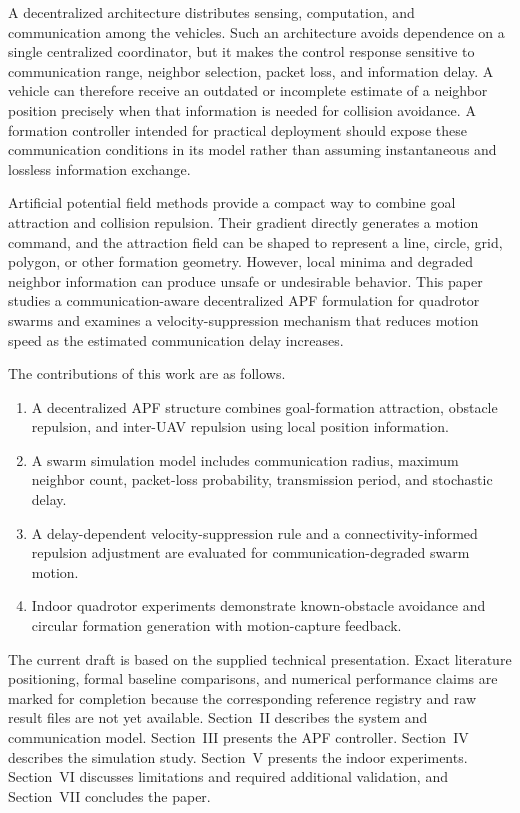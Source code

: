 \documentclass[journal]{IEEEtran}
\begin{document}
A decentralized architecture distributes sensing, computation, and communication among the vehicles. Such an architecture avoids dependence on a single centralized coordinator, but it makes the control response sensitive to communication range, neighbor selection, packet loss, and information delay. A vehicle can therefore receive an outdated or incomplete estimate of a neighbor position precisely when that information is needed for collision avoidance. A formation controller intended for practical deployment should expose these communication conditions in its model rather than assuming instantaneous and lossless information exchange.

Artificial potential field methods provide a compact way to combine goal attraction and collision repulsion. Their gradient directly generates a motion command, and the attraction field can be shaped to represent a line, circle, grid, polygon, or other formation geometry. However, local minima and degraded neighbor information can produce unsafe or undesirable behavior. This paper studies a communication-aware decentralized APF formulation for quadrotor swarms and examines a velocity-suppression mechanism that reduces motion speed as the estimated communication delay increases.

The contributions of this work are as follows.
\begin{enumerate}
    \item A decentralized APF structure combines goal-formation attraction, obstacle repulsion, and inter-UAV repulsion using local position information.
    \item A swarm simulation model includes communication radius, maximum neighbor count, packet-loss probability, transmission period, and stochastic delay.
    \item A delay-dependent velocity-suppression rule and a connectivity-informed repulsion adjustment are evaluated for communication-degraded swarm motion.
    \item Indoor quadrotor experiments demonstrate known-obstacle avoidance and circular formation generation with motion-capture feedback.
\end{enumerate}

The current draft is based on the supplied technical presentation. Exact literature positioning, formal baseline comparisons, and numerical performance claims are marked for completion because the corresponding reference registry and raw result files are not yet available. Section~II describes the system and communication model. Section~III presents the APF controller. Section~IV describes the simulation study. Section~V presents the indoor experiments. Section~VI discusses limitations and required additional validation, and Section~VII concludes the paper.
\end{document}
